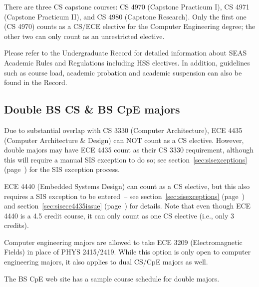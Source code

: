 
There are three CS capstone courses: CS 4970 (Capstone Practicum I), 
CS 4971 (Capstone Practicum II), and CS 4980 (Capstone Research).
Only the first one (CS 4970) counts as a CS/ECE elective for the
Computer Engineering degree; the other two can only count as an
unrestricted elective.

Please refer to the Undergraduate
Record for detailed
information about SEAS Academic Rules and Regulations including HSS
electives. In addition, guidelines such as course load, academic
probation and academic suspension can also be found in the Record.


\subsection{Double BS CS \& BS CpE majors}
\label{bscscpedoublemajors}

Due to substantial overlap with CS 3330 (Computer Architecture), ECE
4435 (Computer Architecture \& Design) can NOT count as a CS elective.
However, double majors may have ECE 4435 count as their CS 3330
requirement, although this will require a manual SIS exception to do
so; see section~\ref{sec:sisexceptions}
(page~\pageref{sec:sisexceptions}) for the SIS exception process.

ECE 4440 (Embedded Systems Design) can count as a CS elective, but
this also requires a SIS exception to be entered~-- see
section~\ref{sec:sisexceptions} (page~\pageref{sec:sisexceptions})
and section~\ref{sec:sisece4435issue} (page~\pageref{sec:sisece4435issue})
for details.  Note that even though ECE 4440 is a 4.5 credit course,
it can only count as one CS elective (i.e., only 3 credits).

Computer engineering majors are allowed to take ECE 3209
(Electromagnetic Fields) in place of PHYS 2415/2419.  While this
option is only open to computer engineering majors, it also applies to
dual CS/CpE majors as well.

The BS CpE web site has a
sample course schedule for double majors.


